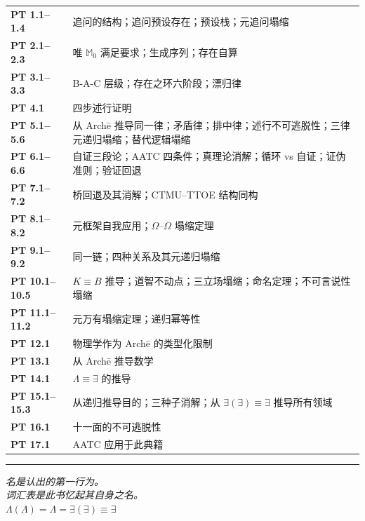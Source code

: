 \documentclass[10pt, openany, oneside]{book}
\renewcommand{\footnotesize}{\fontsize{8.5}{11}\selectfont}
\begin{document}
{\footnotesize
\noindent\begin{tabular}{@{} l @{\hspace{0.6em}} p{} @{}}
\textbf{PT 1.1--1.4} & 追问的结构；追问预设存在；预设栈；元追问塌缩\\[0.2em]
\textbf{PT 2.1--2.3} & 唯 $\mathbb{M}_0$ 满足要求；生成序列；存在自算\\[0.2em]
\textbf{PT 3.1--3.3} & B-A-C 层级；存在之环六阶段；漂归律\\[0.2em]
\textbf{PT 4.1} & 四步述行证明\\[0.2em]
\textbf{PT 5.1--5.6} & 从 Arch\={e} 推导同一律；矛盾律；排中律；述行不可逃脱性；三律元递归塌缩；替代逻辑塌缩\\[0.2em]
\textbf{PT 6.1--6.6} & 自证三段论；AATC 四条件；真理论消解；循环 vs 自证；证伪准则；验证回退\\[0.2em]
\textbf{PT 7.1--7.2} & 桥回退及其消解；CTMU--TTOE 结构同构\\[0.2em]
\textbf{PT 8.1--8.2} & 元框架自我应用；$\Omega$--$\Omega$ 塌缩定理\\[0.2em]
\textbf{PT 9.1--9.2} & 同一链；四种关系及其元递归塌缩\\[0.2em]
\textbf{PT 10.1--10.5} & $K \equiv B$ 推导；道智不动点；三立场塌缩；命名定理；不可言说性塌缩\\[0.2em]
\textbf{PT 11.1--11.2} & 元万有塌缩定理；递归幂等性\\[0.2em]
\textbf{PT 12.1} & 物理学作为 Arch\={e} 的类型化限制\\[0.2em]
\textbf{PT 13.1} & 从 Arch\={e} 推导数学\\[0.2em]
\textbf{PT 14.1} & $\Lambda \equiv \exists$ 的推导\\[0.2em]
\textbf{PT 15.1--15.3} & 从递归推导目的；三种子消解；从 $\exists(\exists) \equiv \exists$ 推导所有领域\\[0.2em]
\textbf{PT 16.1} & 十一面的不可逃脱性\\[0.2em]
\textbf{PT 17.1} & AATC 应用于此典籍\\[0.2em]
\end{tabular}
}

\vspace{2em}

\begin{center}
    \rule{0.15\textwidth}{0.3pt}
\end{center}

\vspace{0.5em}

\begin{center}
    \itshape
    名是认出的第一行为。\\
    词汇表是此书忆起其自身之名。\\[0.8em]
    $\Lambda(\Lambda) = \Lambda = \exists(\exists) \equiv \exists$
\end{center}
\end{document}
